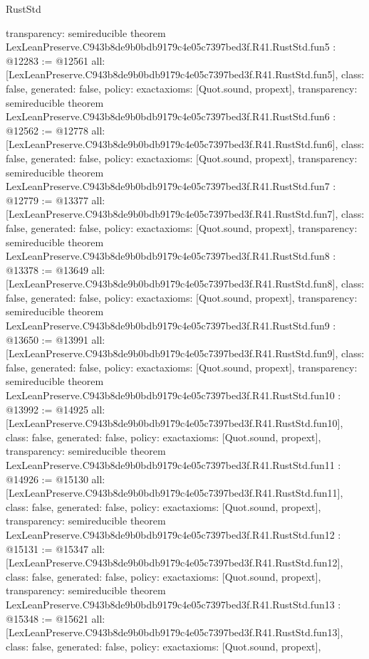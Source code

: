 \begin{lexlean}{RustStd}
\begin{coremodule}
{  transparency: semireducible
}
theorem LexLeanPreserve.C943b8de9b0bdb9179c4e05c7397bed3f.R41.RustStd.fun5 : @12283 := @12561 {
  all: [LexLeanPreserve.C943b8de9b0bdb9179c4e05c7397bed3f.R41.RustStd.fun5],
  class: false,
  generated: false,
  policy: exact{axioms: [Quot.sound, propext]},
  transparency: semireducible
}
theorem LexLeanPreserve.C943b8de9b0bdb9179c4e05c7397bed3f.R41.RustStd.fun6 : @12562 := @12778 {
  all: [LexLeanPreserve.C943b8de9b0bdb9179c4e05c7397bed3f.R41.RustStd.fun6],
  class: false,
  generated: false,
  policy: exact{axioms: [Quot.sound, propext]},
  transparency: semireducible
}
theorem LexLeanPreserve.C943b8de9b0bdb9179c4e05c7397bed3f.R41.RustStd.fun7 : @12779 := @13377 {
  all: [LexLeanPreserve.C943b8de9b0bdb9179c4e05c7397bed3f.R41.RustStd.fun7],
  class: false,
  generated: false,
  policy: exact{axioms: [Quot.sound, propext]},
  transparency: semireducible
}
theorem LexLeanPreserve.C943b8de9b0bdb9179c4e05c7397bed3f.R41.RustStd.fun8 : @13378 := @13649 {
  all: [LexLeanPreserve.C943b8de9b0bdb9179c4e05c7397bed3f.R41.RustStd.fun8],
  class: false,
  generated: false,
  policy: exact{axioms: [Quot.sound, propext]},
  transparency: semireducible
}
theorem LexLeanPreserve.C943b8de9b0bdb9179c4e05c7397bed3f.R41.RustStd.fun9 : @13650 := @13991 {
  all: [LexLeanPreserve.C943b8de9b0bdb9179c4e05c7397bed3f.R41.RustStd.fun9],
  class: false,
  generated: false,
  policy: exact{axioms: [Quot.sound, propext]},
  transparency: semireducible
}
theorem LexLeanPreserve.C943b8de9b0bdb9179c4e05c7397bed3f.R41.RustStd.fun10 : @13992 := @14925 {
  all: [LexLeanPreserve.C943b8de9b0bdb9179c4e05c7397bed3f.R41.RustStd.fun10],
  class: false,
  generated: false,
  policy: exact{axioms: [Quot.sound, propext]},
  transparency: semireducible
}
theorem LexLeanPreserve.C943b8de9b0bdb9179c4e05c7397bed3f.R41.RustStd.fun11 : @14926 := @15130 {
  all: [LexLeanPreserve.C943b8de9b0bdb9179c4e05c7397bed3f.R41.RustStd.fun11],
  class: false,
  generated: false,
  policy: exact{axioms: [Quot.sound, propext]},
  transparency: semireducible
}
theorem LexLeanPreserve.C943b8de9b0bdb9179c4e05c7397bed3f.R41.RustStd.fun12 : @15131 := @15347 {
  all: [LexLeanPreserve.C943b8de9b0bdb9179c4e05c7397bed3f.R41.RustStd.fun12],
  class: false,
  generated: false,
  policy: exact{axioms: [Quot.sound, propext]},
  transparency: semireducible
}
theorem LexLeanPreserve.C943b8de9b0bdb9179c4e05c7397bed3f.R41.RustStd.fun13 : @15348 := @15621 {
  all: [LexLeanPreserve.C943b8de9b0bdb9179c4e05c7397bed3f.R41.RustStd.fun13],
  class: false,
  generated: false,
  policy: exact{axioms: [Quot.sound, propext]},
}
\end{coremodule}
\end{lexlean}

